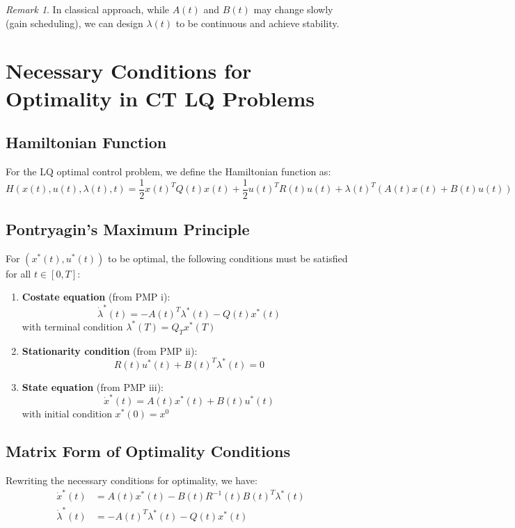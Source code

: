 \documentclass[openany]{book}
\theoremstyle{definition}
\theoremstyle{remark}
\newtheorem*{remark}{Remark}
\begin{document}
\begin{remark}
In classical approach, while $A(t)$ and $B(t)$ may change slowly (gain scheduling), we can design $\lambda(t)$ to be continuous and achieve stability.
\end{remark}

\section{Necessary Conditions for Optimality in CT LQ Problems}

\subsection{Hamiltonian Function}
For the LQ optimal control problem, we define the Hamiltonian function as:
\[
    H(x(t),u(t),\lambda(t),t) = \frac{1}{2}x(t)^TQ(t)x(t) + \frac{1}{2}u(t)^TR(t)u(t) + \lambda(t)^T(A(t)x(t) + B(t)u(t))
\]

\subsection{Pontryagin's Maximum Principle}
For $(x^*(t),u^*(t))$ to be optimal, the following conditions must be satisfied for all $t\in[0,T]$:

\begin{enumerate}
    \item \textbf{Costate equation} (from PMP i):
        \[
            \dot{\lambda}^*(t) = -A(t)^T\lambda^*(t) - Q(t)x^*(t)
        \]
        with terminal condition $\lambda^*(T) = Q_Tx^*(T)$

    \item \textbf{Stationarity condition} (from PMP ii):
        \[
            R(t)u^*(t) + B(t)^T\lambda^*(t) = 0
        \]

    \item \textbf{State equation} (from PMP iii):
        \[
            \dot{x}^*(t) = A(t)x^*(t) + B(t)u^*(t)
        \]
        with initial condition $x^*(0) = x^0$
\end{enumerate}

\subsection{Matrix Form of Optimality Conditions}
Rewriting the necessary conditions for optimality, we have:
\begin{align*}
    \dot{x}^*(t) &= A(t)x^*(t) - B(t)R^{-1}(t)B(t)^T\lambda^*(t)\\
    \dot{\lambda}^*(t) &= -A(t)^T\lambda^*(t) - Q(t)x^*(t)
\end{align*}
\end{document}
